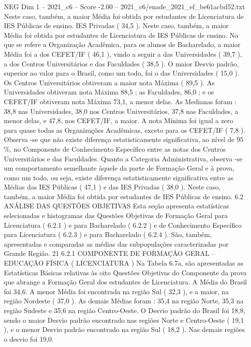 \begin{textsample}{NEG Dim 1 – 2021\_c6 – Score -2.00 – 2021\_c6/enade\_2021\_ef\_be61acbd52.txt}
Neste caso, também, a maior Média foi obtida por estudantes de Licenciatura de IES Públicas de ensino.
IES Privadas ( 34,5 ).
Neste caso, também, a maior Média foi obtida por estudantes de Licenciatura de IES Públicas de ensino.
No que se refere a Organização Acadêmica, para os alunos de Bacharelado, a maior Média foi a dos CEFET/IF ( 46,1 ), vindo a seguir a das Universidades ( 39,7 ), a dos Centros Universitários e das Faculdades ( 38,5 ).
O maior Desvio padrão, superior ao valor para o Brasil, como um todo, foi o das Universidades ( 15,0 ).
Os Centros Universitários obtiveram a maior nota Máxima ( 89,5 ).
As Universidades obtiveram nota Máxima 88,5 ; as Faculdades, 86,0 ; e os CEFET/IF obtiveram nota Máxima 73,1, a menor delas.
As Medianas foram : 38,8 nas Universidades, 38,0 nos Centros Universitários, 37,8 nas Faculdades, a menor delas, e 47,8, nos CEFET/IF, a maior.
A nota Mínima foi igual a zero para quase todas as Organizações Acadêmicas, exceto para os CEFET/IF ( 7,8 ).
Observa -se que não existe diferença estatisticamente significativa, ao nível de 95 \%, no Componente de Conhecimento Específico entre as notas dos Centros Universitários e das Faculdades.
Quanto a Categoria Administrativa, observa -se um comportamento semelhante àquele da parte de Formação Geral e à prova, como um todo, ou seja, existe diferença estatisticamente significativa entre as Médias das IES Públicas ( 47,1 ) e das IES Privadas ( 38,0 ).
Neste caso, também, a maior Média foi obtida por estudantes de IES Públicas de ensino. 6.2 ANÁLISE DAS QUESTÕES OBJETIVAS Esta seção apresenta estatísticas selecionadas e histogramas das Questões Objetivas de Formação Geral para Licenciatura ( 6.2.1 ) e para Bacharelado ( 6.2.2 ) e de Conhecimento Específico para Licenciatura ( 6.2.3 ) e para Bacharelado ( 6.2.4 ).
São, também, apresentadas e comparadas as médias das subpopulações caracterizadas por Grande Região. 21 6.2.1 COMPONENTE DE FORMAÇÃO GERAL – EDUCAÇÃO FÍSICA ( LICENCIATURA ) Na Tabela 6.7a, são apresentadas as Estatísticas Básicas relativas às oito Questões Objetivas do Componente da prova que abrange a Formação Geral dos estudantes de Licenciatura.
A Média do Brasil foi 34,6.
A menor Média foi encontrada na região Sul ( 32,3 ), e a maior, na região Nordeste ( 37,0 ).
As demais Médias foram : 35,4 na região Norte, 35,3 na região Sudeste e 35,6 na região Centro-Oeste.
O Desvio padrão do Brasil foi 18,8, sendo o maior Desvio padrão encontrado nas regiões Norte e Centro-Oeste ( 19,1 ), e o menor Desvio padrão encontrado na região Sul ( 18,2 ).
Nas demais regiões o desvio foi 19,0.

\end{textsample}
